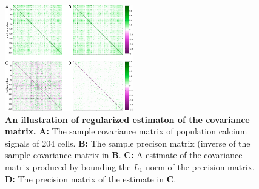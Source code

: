 \begin{figure}[htp]
\begin{center}
\includegraphics[width=0.5\textwidth]{figures/Figure0.pdf}
\end{center}
\caption{
{\bf An illustration of regularized estimaton of the covariance matrix.}  
{\bf A:} The sample covariance matrix of population calcium signals of 204 cells.
{\bf B:} The sample precison matrix (inverse of the sample covariance matrix in {\bf B}.
{\bf C:} A estimate of the covariance matrix produced by bounding the $L_1$ norm of the precision matrix. 
{\bf D:} The precision matrix of the estimate in {\bf C}.
}
\label{fig:00}
\end{figure}
